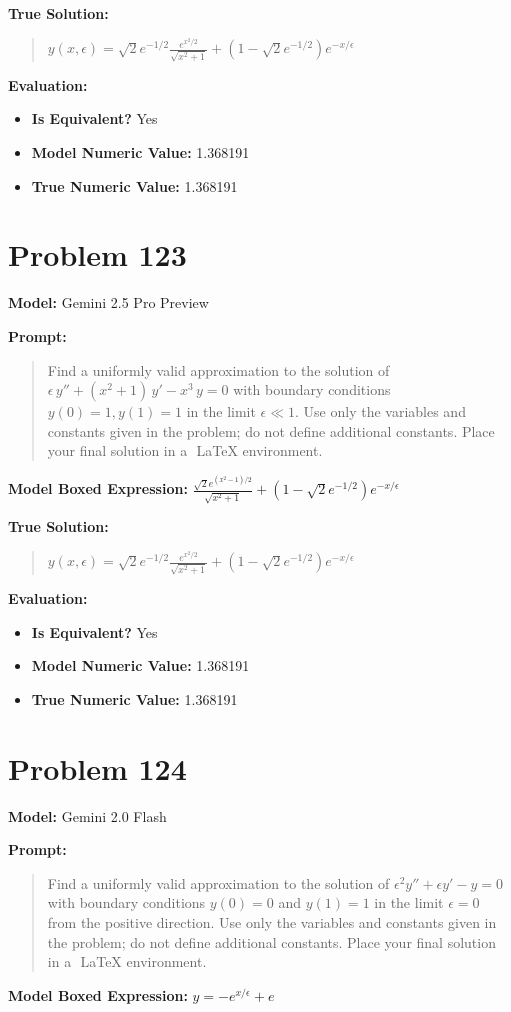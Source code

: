 \documentclass{article}
\begin{document}
{\textbf{True Solution:}
\begin{quote}
$y(x, \epsilon) = \sqrt{2}e^{-1/2} \frac{e^{x^2/2}}{\sqrt{x^2+1}} + \left( 1 - \sqrt{2}e^{-1/2} \right) e^{-x/\epsilon}$
\end{quote}

\textbf{Evaluation:}
\begin{itemize}
\item \textbf{Is Equivalent?} Yes
\item \textbf{Model Numeric Value:} 1.368191
\item \textbf{True Numeric Value:} 1.368191
\end{itemize}
\vspace{1cm}
\section*{Problem 123}
\textbf{Model:} Gemini 2.5 Pro Preview

\textbf{Prompt:}
\begin{quote}
Find a uniformly valid approximation to the solution of $\epsilon\,y'' + (x^2+1)\,y' - x^3\,y = 0$ with boundary conditions $y(0)=1, y(1)=1$ in the limit $\epsilon \ll 1$. Use only the variables and constants given in the problem; do not define additional constants. Place your final solution in a $\boxed{}$ LaTeX environment.
\end{quote}
\textbf{Model Boxed Expression:} $\frac{\sqrt{2}e^{(x^2-1)/2}}{\sqrt{x^2+1}} + (1-\sqrt{2}e^{-1/2})e^{-x/\epsilon}$

\textbf{True Solution:}
\begin{quote}
$y(x, \epsilon) = \sqrt{2}e^{-1/2} \frac{e^{x^2/2}}{\sqrt{x^2+1}} + \left( 1 - \sqrt{2}e^{-1/2} \right) e^{-x/\epsilon}$
\end{quote}

\textbf{Evaluation:}
\begin{itemize}
\item \textbf{Is Equivalent?} Yes
\item \textbf{Model Numeric Value:} 1.368191
\item \textbf{True Numeric Value:} 1.368191
\end{itemize}
\vspace{1cm}
\section*{Problem 124}
\textbf{Model:} Gemini 2.0 Flash

\textbf{Prompt:}
\begin{quote}
Find a uniformly valid approximation to the solution of $\epsilon^2 y'' + \epsilon y' - y = 0$ with boundary conditions $y(0) = 0$ and $y(1) = 1$ in the limit $\epsilon = 0$ from the positive direction. Use only the variables and constants given in the problem; do not define additional constants. Place your final solution in a $\boxed{}$ LaTeX environment.
\end{quote}
\textbf{Model Boxed Expression:} $y = -e^{x/\epsilon} + e$

}
\end{document}
